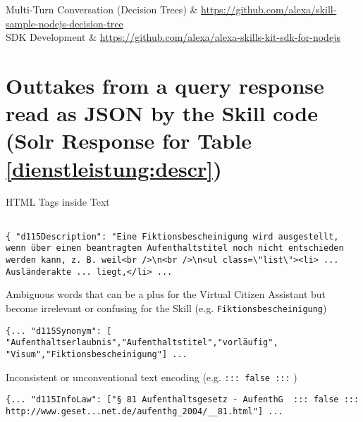 \begin{flushleft}
\begin{tabu}
Multi-Turn Conversation (Decision Trees) & \url{https://github.com/alexa/skill-sample-nodejs-decision-tree}\\


SDK Development & \url{https://github.com/alexa/alexa-skills-kit-sdk-for-nodejs}\\

	\end{tabu}
\end{flushleft}







\clearpage

\section*{Outtakes from a query response read as JSON by the Skill code (Solr Response for Table \ref{dienstleistung:descr})}
\label{query:dl}

HTML Tags inside Text
\begin{verbatim}

{ "d115Description": "Eine Fiktionsbescheinigung wird ausgestellt, wenn über einen beantragten Aufenthaltstitel noch nicht entschieden werden kann, z. B. weil<br />\n<br />\n<ul class=\"list\"><li> ... Ausländerakte ... liegt,</li> ...
\end{verbatim}

Ambiguous words that can be a plus for the Virtual Citizen Assistant but become irrelevant or confusing for the Skill (e.g. \texttt{Fiktionsbescheinigung})
\begin{verbatim}
{... "d115Synonym": [
"Aufenthaltserlaubnis","Aufenthaltstitel","vorläufig",
"Visum","Fiktionsbescheinigung"] ...
\end{verbatim}

Inconsistent or unconventional text encoding (e.g. \texttt{::: false :::} )
\begin{verbatim}
{... "d115InfoLaw": ["§ 81 Aufenthaltsgesetz - AufenthG  ::: false ::: http://www.geset...net.de/aufenthg_2004/__81.html"] ...
\end{verbatim}


